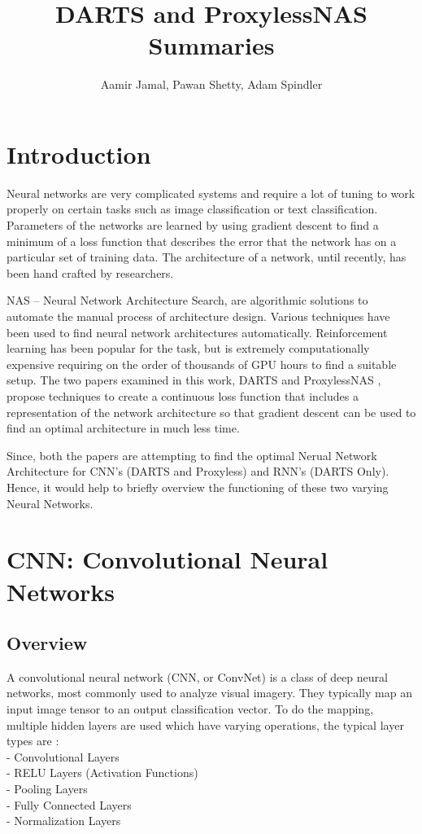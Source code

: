 \documentclass{ieee}
\title{DARTS and ProxylessNAS Summaries}
\author{Aamir Jamal, Pawan Shetty, Adam Spindler}
\begin{document}
\maketitle

\section{Introduction}
Neural networks are very complicated systems and require a lot of tuning to work properly on certain tasks such as image classification or text classification. Parameters of the networks are learned by using gradient descent to find a minimum of a loss function that describes the error that the network has on a particular set of training data. The architecture of a network, until recently, has been hand crafted by researchers.

NAS – Neural Network Architecture Search, are algorithmic solutions to automate the manual process of architecture design. Various techniques have been used to find neural network architectures automatically. Reinforcement learning has been popular for the task, but is extremely computationally expensive requiring on the order of thousands of GPU hours to find a suitable setup. The two papers examined in this work, DARTS \cite{liu2018darts} and ProxylessNAS \cite{cai2018proxylessnas}, propose techniques to create a continuous loss function that includes a representation of the network architecture so that gradient descent can be used to find an optimal architecture in much less time.

Since, both the papers are attempting to find the optimal Nerual Network Architecture for CNN's (DARTS and Proxyless) and RNN's (DARTS Only). Hence, it would help to briefly overview the functioning of these two varying Neural Networks.


\section{CNN: Convolutional Neural Networks}
\subsection{Overview}
A convolutional neural network (CNN, or ConvNet) is a class of deep neural networks, most commonly used to analyze visual imagery. They typically map an input image tensor to an output classification vector. To do the mapping, multiple hidden layers are used which have varying operations, the typical layer types are :\\
- Convolutional Layers \\
- RELU Layers (Activation Functions) \\
- Pooling Layers \\
- Fully Connected Layers \\
- Normalization Layers \\
\end{document}
